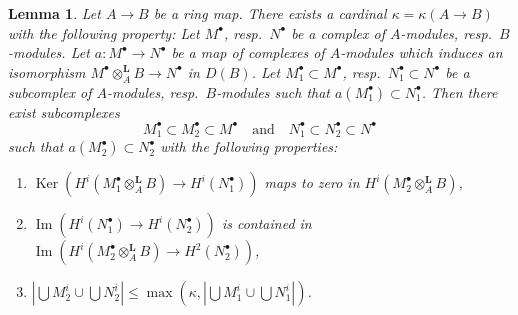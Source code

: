 \documentclass[10pt,a4paper]{amsart}
\theoremstyle{plain}
\newtheorem{lemma}[subsection]{Lemma}
\theoremstyle{definition}
\theoremstyle{remark}
\numberwithin{equation}{subsection}
\def\Ker{\mathop{\mathrm{Ker}}}
\def\Im{\mathop{\mathrm{Im}}}
\begin{document}
\begin{lemma}
\label{lemma-enlarge}
Let $A \to B$ be a ring map. There exists a cardinal $\kappa = \kappa(A \to B)$
with the following property: Let $M^\bullet$, resp.\ $N^\bullet$
be a complex of $A$-modules, resp.\ $B$-modules. Let
$a : M^\bullet \to N^\bullet$ be a map of complexes of $A$-modules
which induces an isomorphism
$M^\bullet \otimes_A^\mathbf{L} B \to N^\bullet$ in $D(B)$.
Let $M_1^\bullet \subset M^\bullet$, resp.\ $N_1^\bullet \subset N^\bullet$
be a subcomplex of $A$-modules, resp.\ $B$-modules such that
$a(M_1^\bullet) \subset N_1^\bullet$. Then there exist
subcomplexes
$$
M_1^\bullet \subset M_2^\bullet \subset M^\bullet
\quad\text{and}\quad
N_1^\bullet \subset N_2^\bullet \subset N^\bullet
$$
such that $a(M_2^\bullet) \subset N_2^\bullet$
with the following properties:
\begin{enumerate}
\item $\Ker(H^i(M_1^\bullet \otimes_A^\mathbf{L} B) \to H^i(N_1^\bullet))$
maps to zero in $H^i(M_2^\bullet \otimes_A^\mathbf{L} B)$,
\item $\Im(H^i(N_1^\bullet) \to H^i(N_2^\bullet))$ is contained in
$\Im(H^i(M_2^\bullet \otimes_A^\mathbf{L} B) \to H^2(N_2^\bullet))$,
\item $|\bigcup M_2^i \cup \bigcup N_2^i| \leq
\max(\kappa, |\bigcup M_1^i \cup \bigcup N_1^i|)$.
\end{enumerate}
\end{lemma}
\end{document}
